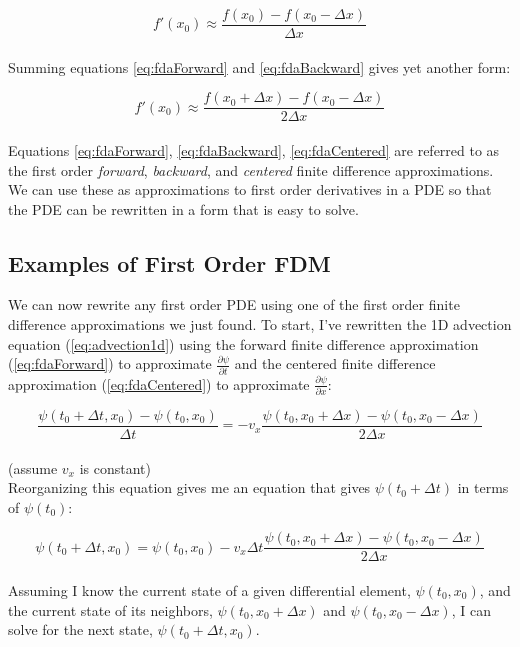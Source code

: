 { \begin{equation}\label{eq:fdaBackward}
 f'(x_{0}) \approx \frac{f(x_{0}) - f(x_{0} - \Delta  x)}{\Delta  x}
  \end{equation}
    \\
Summing equations \ref{eq:fdaForward} and \ref{eq:fdaBackward} gives yet another form:
  
     \begin{equation}\label{eq:fdaCentered}
 f'(x_{0}) \approx \frac{f(x_{0} + \Delta  x) - f(x_{0} - \Delta  x)}{2\Delta x}
  \end{equation}
  \\
  Equations \ref{eq:fdaForward}, \ref{eq:fdaBackward}, \ref{eq:fdaCentered} are referred to as the first order \textit{forward}, \textit{backward}, and \textit{centered} finite difference approximations.  We can use these as approximations to first order derivatives in a PDE so that the PDE can be rewritten in a form that is easy to solve.
  
\subsection{Examples of First Order FDM}

We can now rewrite any first order PDE using one of the first order finite difference approximations we just found.  To start, I've rewritten the 1D advection equation (\ref{eq:advection1d}) using the forward finite difference approximation (\ref{eq:fdaForward}) to approximate $\frac{\partial \psi}{\partial t}$ and the centered finite difference approximation (\ref{eq:fdaCentered}) to approximate $\frac{\partial \psi}{\partial x}$:

 \begin{equation}
  \frac{ \psi(t_{0} + \Delta  t,  x_{0}) - \psi(t_{0}, x_{0})}{\Delta t} = -v_{x}\frac{\psi(t_{0}, x_{0} + \Delta  x)-\psi(t_{0}, x_{0}-\Delta x)}{2\Delta  x}
  \end{equation}
  \\
  (assume $v_{x}$ is constant)\\
  
  Reorganizing this equation gives me an equation that gives $\psi(t_{0}+\Delta t)$ in terms of $\psi(t_{0})$:
  
   \begin{equation}\label{eq:advection1Dapprox}
  \psi(t_{0} + \Delta  t,  x_{0}) = \psi(t_{0}, x_{0})-v_{x}\Delta t \frac{\psi(t_{0}, x_{0} + \Delta  x)-\psi(t_{0}, x_{0}-\Delta x)}{2\Delta  x}
  \end{equation}
\\
Assuming I know the current state of a given differential element, $\psi(t_{0}, x_{0})$, and the current state of its neighbors, $\psi(t_{0}, x_{0}+\Delta x)$ and $\psi(t_{0}, x_{0}-\Delta x)$, I can solve for the next state, $\psi(t_{0}+\Delta t, x_{0})$.\\

}
